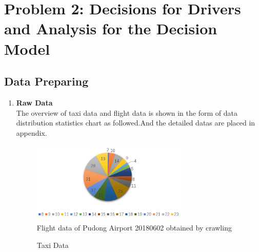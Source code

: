 \section{Problem 2: Decisions for Drivers and Analysis for the Decision Model}
\subsection{Data Preparing}
\begin{enumerate}
\item \textbf{Raw Data} \\
The overview of taxi data and flight data is shown in the form of data distribution statistics chart as followed.And the detailed datas are placed in appendix.
\begin{figure}[H]
\centering
\includegraphics[width=0.7\textwidth]{figures/Q2_1.png}
\caption{Flight data of Pudong Airport 20180602 obtained by crawling}
\label{fig:label}
\end{figure}

\begin{figure}[H]
\centering  
{}
\caption{ Taxi Data }
\label{Fig.q211}
\end{figure}


\end{enumerate}
